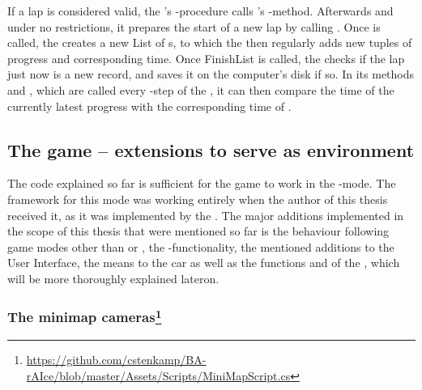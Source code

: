 If a lap is considered valid, the 's -procedure calls 's -method. Afterwards and under no restrictions, it prepares the start of a new lap by calling . Once  is called, the  creates a new List of s, to which the  then regularly adds new tuples of progress and corresponding time. Once FinishList is called, the  checks if the lap just now is a new record, and saves it on the computer's disk if so. In its methods  and , which are called every -step of the , it can then compare the time of the currently latest progress with the corresponding time of . \\

\subsection{The game -- extensions to serve as environment}

The code explained so far is sufficient for the game to work in the -mode. The framework for this mode was working entirely when the author of this thesis received it, as it was implemented by the \leonbase. The major additions implemented in the scope of this thesis that were mentioned so far is the behaviour following game modes other than  or , the -functionality, the mentioned additions to the User Interface, the means to  the car as well as the functions  and  of the , which will be more thoroughly explained lateron.

\subsubsection{The minimap cameras\footnote{\url{https://github.com/cstenkamp/BA-rAIce/blob/master/Assets/Scripts/MiniMapScript.cs}}}
\label{ch:minimap}

